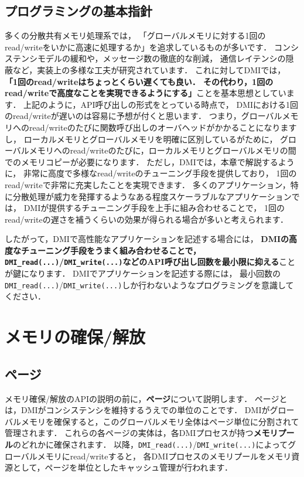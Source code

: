 \documentclass[report,12pt]{jsbook}
\begin{document}
\subsection{プログラミングの基本指針}

多くの分散共有メモリ処理系では，
「グローバルメモリに対する1回のread/writeをいかに高速に処理するか」を追求しているものが多いです．
コンシステンシモデルの緩和や，メッセージ数の徹底的な削減，
通信レイテンシの隠蔽など，実装上の多様な工夫が研究されています．
これに対してDMIでは，
\textbf{「1回のread/writeはちょっとくらい遅くても良い．
その代わり，1回のread/writeで高度なことを実現できるようにする」}ことを基本思想としています．
上記のように，API呼び出しの形式をとっている時点で，
DMIにおける1回のread/writeが遅いのは容易に予想が付くと思います．
つまり，グローバルメモリへのread/writeのたびに関数呼び出しのオーバヘッドがかかることになりますし，
ローカルメモリとグローバルメモリを明確に区別しているがために，
グローバルメモリへのread/writeのたびに，ローカルメモリとグローバルメモリの間でのメモリコピーが必要になります．
ただし，DMIでは，本章で解説するように，
非常に高度で多様なread/writeのチューニング手段を提供しており，
1回のread/writeで非常に充実したことを実現できます．
多くのアプリケーション，特に分散処理が威力を発揮するようなある程度スケーラブルなアプリケーションでは，
DMIが提供するチューニング手段を上手に組み合わせることで，
1回のread/writeの遅さを補うくらいの効果が得られる場合が多いと考えられます．

したがって，DMIで高性能なアプリケーションを記述する場合には，
\textbf{DMIの高度なチューニング手段をうまく組み合わせることで，
  \texttt{DMI\_read(...)}/\texttt{DMI\_write(...)}などのAPI呼び出し回数を最小限に抑える}ことが鍵になります．
DMIでアプリケーションを記述する際には，
最小回数の\texttt{DMI\_read(...)}/\texttt{DMI\_write(...)}しか行わないようなプログラミングを意識してください．


\section{メモリの確保/解放}

\subsection{ページ}

メモリ確保/解放のAPIの説明の前に，\textbf{ページ}について説明します．
ページとは，DMIがコンシステンシを維持するうえでの単位のことです．
DMIがグローバルメモリを確保すると，このグローバルメモリ全体はページ単位に分割されて管理されます．
これらの各ページの実体は，各DMIプロセスが持つ\textbf{メモリプール}のどれかに確保されます．
以降，\texttt{DMI\_read(...)}/\texttt{DMI\_write(...)}によってグローバルメモリにread/writeすると，
各DMIプロセスのメモリプールをメモリ資源として，ページを単位としたキャッシュ管理が行われます．
\end{document}
